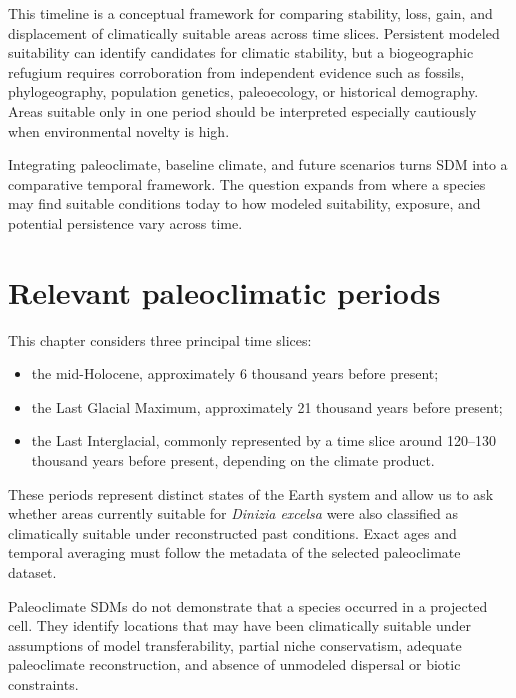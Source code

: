 This timeline is a conceptual framework for comparing stability, loss, gain, and displacement of climatically suitable areas across time slices. Persistent modeled suitability can identify candidates for climatic stability, but a biogeographic refugium requires corroboration from independent evidence such as fossils, phylogeography, population genetics, paleoecology, or historical demography. Areas suitable only in one period should be interpreted especially cautiously when environmental novelty is high.

\begin{conceito}[title={\faBook\quad Temporal SDM}]
Integrating paleoclimate, baseline climate, and future scenarios turns SDM into a comparative temporal framework. The question expands from where a species may find suitable conditions today to how modeled suitability, exposure, and potential persistence vary across time.
\end{conceito}

\section{Relevant paleoclimatic periods}

This chapter considers three principal time slices:

\begin{itemize}
\item the mid-Holocene, approximately 6 thousand years before present;
\item the Last Glacial Maximum, approximately 21 thousand years before present;
\item the Last Interglacial, commonly represented by a time slice around 120--130 thousand years before present, depending on the climate product.
\end{itemize}

These periods represent distinct states of the Earth system and allow us to ask whether areas currently suitable for \textit{Dinizia excelsa} were also classified as climatically suitable under reconstructed past conditions. Exact ages and temporal averaging must follow the metadata of the selected paleoclimate dataset.

\begin{atencao}[title={\faExclamationTriangle\quad Paleoclimate projections are hypotheses}]
Paleoclimate SDMs do not demonstrate that a species occurred in a projected cell. They identify locations that may have been climatically suitable under assumptions of model transferability, partial niche conservatism, adequate paleoclimate reconstruction, and absence of unmodeled dispersal or biotic constraints.
\end{atencao}

